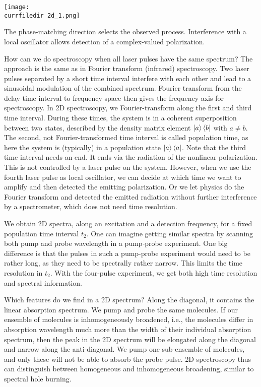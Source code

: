 \begin{marginfigure}
\texttt{[image: \\currfiledir 2d\_1.png]}
\caption{The phase-matching direction selects the observed process. Interference with a local oscillator allows detection of a complex-valued polarization.}
\label{fig_2d_setup}
\end{marginfigure}


How can we do spectroscopy when all laser pulses have the same spectrum? The approach is the same as in Fourier transform (infrared) spectroscopy. Two laser pulses separated by a short time interval interfere with each other and lead to a sinusoidal modulation of the combined spectrum. Fourier transform from the delay time interval to frequency space then gives the frequency axis for spectroscopy. In 2D spectroscopy, we Fourier-transform along the first and third time interval. During these times, the system is in a coherent superposition between two states, described by the density matrix element $\ket{a}\bra{b}$ with $a \neq b$. The second, not Fourier-transformed time interval is called population time, as here the system is (typically) in a population state $\ket{a}\bra{a}$. Note that the third time interval needs an end. It ends via the radiation of the nonlinear polarization. This is not controlled by a laser pulse on the system. However, when we use the fourth laser pulse as local oscillator, we can decide at which  time we want to amplify and then detected the emitting polarization. Or we let physics do the Fourier transform and detected the emitted radiation without further interference by a spectrometer, which does not need time resolution.

We obtain 2D spectra, along an excitation and a detection frequency, for a fixed population time interval $t_2$. One can imagine getting similar spectra by scanning both pump and probe wavelength in a pump-probe experiment. One big difference is that the pulses in such a pump-probe experiment would need to be rather long, as they need to be spectrally rather narrow. This limits the time resolution in $t_2$. With the four-pulse experiment, we get both high time resolution and spectral information.

Which features do we find in a 2D spectrum? Along the diagonal, it contains the linear absorption spectrum. We pump and probe the same molecules. If our ensemble of molecules is inhomogeneously broadened, i.e., the molecules differ in absorption wavelength much more than the width of their individual absorption spectrum, then the peak in the 2D spectrum will be elongated along the diagonal and narrow along the anti-diagonal. We pump one sub-ensemble of molecules, and only these will not be able to absorb the probe pulse. 2D spectroscopy thus can distinguish between homogeneous and inhomogeneous broadening, similar to spectral hole burning.


